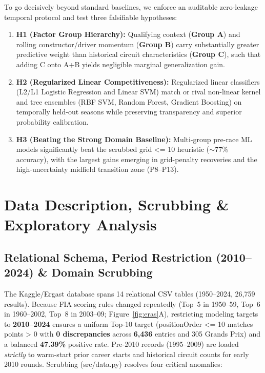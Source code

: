 \documentclass[10pt,a4paper,twocolumn]{article}
\newcommand{\code}[1]{{\fontsize{8.5pt}{10pt}\selectfont\ttfamily #1}}
\begin{document}
To go decisively beyond standard baselines, we enforce an auditable zero-leakage temporal protocol and test three falsifiable hypotheses:
\begin{enumerate}
  \item \textbf{H1 (Factor Group Hierarchy):} Qualifying context (\textbf{Group A}) and rolling constructor/driver momentum (\textbf{Group B}) carry substantially greater predictive weight than historical circuit characteristics (\textbf{Group C}), such that adding \code{C} onto \code{A+B} yields negligible marginal generalization gain.
  \item \textbf{H2 (Regularized Linear Competitiveness):} Regularized linear classifiers (L2/L1 Logistic Regression and Linear SVM) match or rival non-linear kernel and tree ensembles (RBF SVM, Random Forest, Gradient Boosting) on temporally held-out seasons while preserving transparency and superior probability calibration.
  \item \textbf{H3 (Beating the Strong Domain Baseline):} Multi-group pre-race ML models significantly beat the scrubbed \code{grid <= 10} heuristic ($\sim$77\% accuracy), with the largest gains emerging in grid-penalty recoveries and the high-uncertainty midfield transition zone (P8--P13).
\end{enumerate}

\section{Data Description, Scrubbing \& Exploratory Analysis}

\subsection{Relational Schema, Period Restriction (2010--2024) \& Domain Scrubbing}
The Kaggle/Ergast database spans 14 relational CSV tables (1950--2024, 26,759 results). Because FIA scoring rules changed repeatedly (Top~5 in 1950--59, Top~6 in 1960--2002, Top~8 in 2003--09; Figure~\ref{fig:eras}A), restricting modeling targets to \textbf{2010--2024} ensures a uniform Top-10 target (\code{positionOrder <= 10} matches \code{points > 0} with \textbf{0 discrepancies} across \textbf{6,436} entries and 305 Grands Prix) and a balanced \textbf{47.39\%} positive rate. Pre-2010 records (1995--2009) are loaded \emph{strictly} to warm-start prior career starts and historical circuit counts for early 2010 rounds. Scrubbing (\code{src/data.py}) resolves four critical anomalies:
\end{document}
